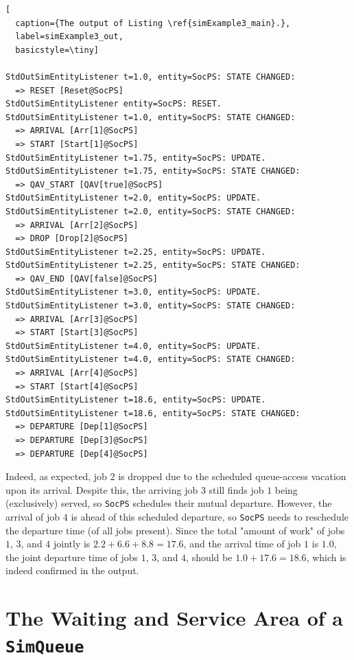 \begin{lstfloat}
\begin{lstlisting}[
  caption={The output of Listing \ref{simExample3_main}.},
  label=simExample3_out,
  basicstyle=\tiny]

StdOutSimEntityListener t=1.0, entity=SocPS: STATE CHANGED:
  => RESET [Reset@SocPS]
StdOutSimEntityListener entity=SocPS: RESET.
StdOutSimEntityListener t=1.0, entity=SocPS: STATE CHANGED:
  => ARRIVAL [Arr[1]@SocPS]
  => START [Start[1]@SocPS]
StdOutSimEntityListener t=1.75, entity=SocPS: UPDATE.
StdOutSimEntityListener t=1.75, entity=SocPS: STATE CHANGED:
  => QAV_START [QAV[true]@SocPS]
StdOutSimEntityListener t=2.0, entity=SocPS: UPDATE.
StdOutSimEntityListener t=2.0, entity=SocPS: STATE CHANGED:
  => ARRIVAL [Arr[2]@SocPS]
  => DROP [Drop[2]@SocPS]
StdOutSimEntityListener t=2.25, entity=SocPS: UPDATE.
StdOutSimEntityListener t=2.25, entity=SocPS: STATE CHANGED:
  => QAV_END [QAV[false]@SocPS]
StdOutSimEntityListener t=3.0, entity=SocPS: UPDATE.
StdOutSimEntityListener t=3.0, entity=SocPS: STATE CHANGED:
  => ARRIVAL [Arr[3]@SocPS]
  => START [Start[3]@SocPS]
StdOutSimEntityListener t=4.0, entity=SocPS: UPDATE.
StdOutSimEntityListener t=4.0, entity=SocPS: STATE CHANGED:
  => ARRIVAL [Arr[4]@SocPS]
  => START [Start[4]@SocPS]
StdOutSimEntityListener t=18.6, entity=SocPS: UPDATE.
StdOutSimEntityListener t=18.6, entity=SocPS: STATE CHANGED:
  => DEPARTURE [Dep[1]@SocPS]
  => DEPARTURE [Dep[3]@SocPS]
  => DEPARTURE [Dep[4]@SocPS]

\end{lstlisting}
\end{lstfloat}

Indeed, as expected, job $2$ is dropped due to the scheduled queue-access vacation
  upon its arrival.
Despite this,
  the arriving job $3$ still finds job $1$ being (exclusively) served,
  so \lstinline|SocPS| schedules their mutual departure.
However,
  the arrival of job $4$ is ahead of this scheduled departure,
  so \lstinline|SocPS| needs to reschedule the departure time
  (of all jobs present).
Since the total "amount of work"
  of jobs $1$, $3$, and $4$ jointly is $2.2 + 6.6 + 8.8 = 17.6$,
  and the arrival time of job $1$ is $1.0$,
  the joint departure time of jobs $1$, $3$, and $4$,
  should be $1.0+17.6=18.6$,
  which is indeed confirmed in the output.

\section{The Waiting and Service Area of a \texttt{SimQueue}}
\label{sec:guided:wait-serv-area}

